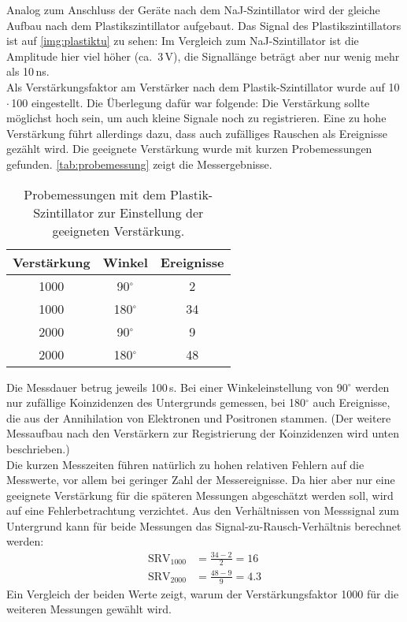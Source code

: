 Analog zum Anschluss der Geräte nach dem NaJ-Szintillator wird der gleiche Aufbau nach dem Plastikszintillator
aufgebaut. Das Signal des Plastikszintillators ist auf \autoref{img:plastiktu} zu sehen:
Im Vergleich zum NaJ-Szintillator ist die Amplitude hier viel höher (ca.~3\,V),
die Signallänge beträgt aber nur wenig mehr als 10\,ns.\\
Als Verstärkungsfaktor am Verstärker nach dem Plastik-Szintillator wurde auf 10\,$\cdot$\,100 eingestellt.
Die Überlegung dafür war folgende: Die Verstärkung sollte möglichst hoch sein,
um auch kleine Signale noch zu registrieren.
Eine zu hohe Verstärkung führt allerdings dazu, dass auch zufälliges Rauschen als Ereignisse gezählt wird.
Die geeignete Verstärkung wurde mit kurzen Probemessungen gefunden.
\autoref{tab:probemessung} zeigt die Messergebnisse.
\begin{table}[H]
\caption{Probemessungen mit dem Plastik-Szintillator zur Einstellung der geeigneten Verstärkung.}
\begin{center}
\begin{tabular}{|c|c|c|}
  \hline
  Verstärkung & Winkel & Ereignisse \\ \hline
  1000 & 90$^\circ$ & 2  \\ \hline
  1000 & 180$^\circ$ & 34  \\ \hline
  2000 & 90$^\circ$ & 9  \\ \hline
  2000 & 180$^\circ$ & 48  \\ \hline
\end{tabular}
\end{center}
\label{tab:probemessung}
\end{table}
Die Messdauer betrug jeweils 100\,s.
Bei einer Winkeleinstellung von 90$^\circ$ werden nur zufällige Koinzidenzen
des Untergrunds gemessen, bei 180$^\circ$ auch Ereignisse, die aus der Annihilation von Elektronen
und Positronen stammen.
(Der weitere Messaufbau nach den Verstärkern zur Registrierung der Koinzidenzen wird unten beschrieben.)\\
Die kurzen Messzeiten führen natürlich zu hohen relativen Fehlern auf die Messwerte,
vor allem bei geringer Zahl der Messereignisse.
Da hier aber nur eine geeignete Verstärkung für die späteren Messungen abgeschätzt werden soll,
wird auf eine Fehlerbetrachtung verzichtet.
Aus den Verhältnissen von Messsignal zum Untergrund kann für beide Messungen das
Signal-zu-Rausch-Verhältnis berechnet werden:
\begin{equation}
  \begin{split}
  \text{SRV}_{1000} & = \frac{34-2}{2} = 16 \\
   \text{SRV}_{2000} & = \frac{48-9}{9} = 4.3
  \end{split}
\end{equation}
Ein Vergleich der beiden Werte zeigt, warum der Verstärkungsfaktor 1000 für die weiteren Messungen gewählt wird.\\

